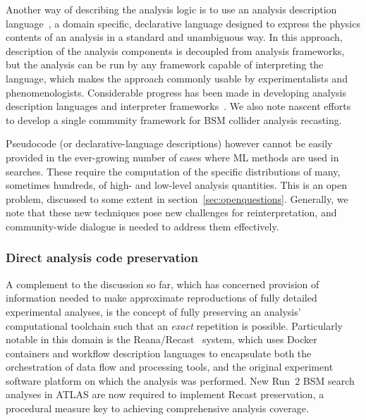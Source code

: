 \documentclass[a4paper,aps,prd,longbibliography,notitlepage,showpacs,amsmath,amssymb,superscriptaddress,nofootinbib,floatfix,11pt,preprintnumbers]{revtex4-1-mod}
\newcommand{\recast}{\textsf{Recast}\xspace}
\renewcommand{\emph}[1]{\textit{#1}}
\begin{document}
Another way of describing the analysis logic is to use an analysis description language~\cite{Brooijmans:2016vro,Brooijmans:2020yij}, a domain specific, declarative language designed to express the physics contents of an analysis in a standard and unambiguous way.  In this approach, description of the analysis components is decoupled from analysis frameworks, but the analysis can be run by any framework capable of interpreting the language, which makes the approach commonly usable by experimentalists and phenomenologists.  Considerable progress has been made in developing analysis description languages and interpreter frameworks~\cite{Sekmen:2018ehb,Unel:2019reo, Brooijmans:2018xbu}.  We also note nascent efforts~\cite{Brooijmans:2020yij} to develop a single community framework for %
BSM collider analysis recasting.

Pseudocode (or declarative-language descriptions) however cannot be easily provided in the ever-growing number of cases where ML methods are used in searches.  These require the computation of the specific distributions of many, sometimes hundreds, of high- and low-level analysis quantities. This is an open problem, discussed to some extent in section~\ref{sec:openquestions}.
Generally, we note that these new techniques pose new challenges for reinterpretation, and community-wide dialogue is needed to address them effectively.


\subsubsection{Direct analysis code preservation}

A complement to the discussion so far, which has concerned provision of information needed to make approximate reproductions of fully detailed experimental analyses, is the concept of fully preserving an analysis' computational toolchain such that an \emph{exact} repetition is possible. Particularly notable in this domain is the \textsf{Reana/Recast}~\cite{Simko:2019ktg} system, which uses Docker containers and workflow description languages to encapsulate both the orchestration of data flow and processing tools, and the original experiment software platform on which the analysis was performed. New Run~2 BSM search analyses in ATLAS
are now required to implement \recast preservation, a procedural measure key to achieving comprehensive analysis coverage.
\end{document}
